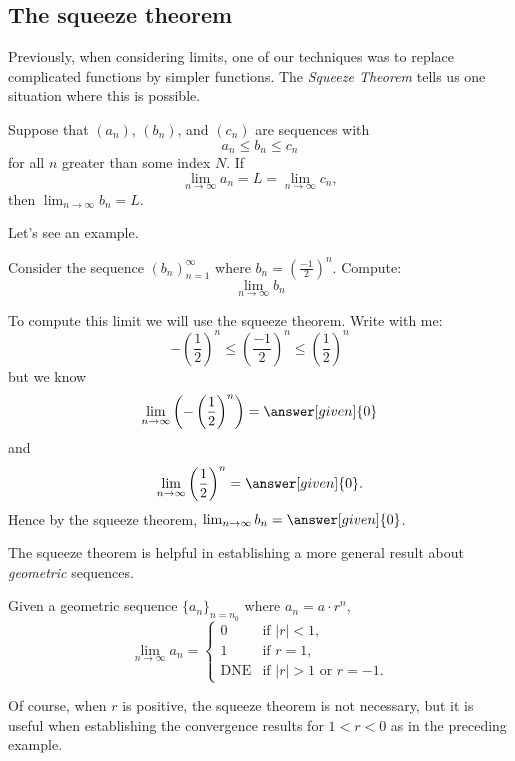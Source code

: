 \documentclass{ximera}
\begin{document}
\subsection{The squeeze theorem}

%

Previously, when considering limits, one of our techniques was to replace 
complicated functions by simpler functions. The \textit{Squeeze Theorem}
tells us one situation where this is possible.

\begin{theorem}
  Suppose that $(a_n)$, $(b_n)$, and $(c_n)$ are sequences with
  \[
  a_n \le b_n \le c_n
  \]
  for all $n$ greater than some index $N$. If
  \[
  \lim_{n\to\infty} a_n = L = \lim_{n\to\infty} c_n,
  \] 
  then $\lim_{n\to\infty} b_n = L$.
\end{theorem}

Let's see an example.

\begin{example}
  Consider the sequence $(b_n)_{n=1}^{\infty}$ where $b_n =
  \left(\frac{-1}{2}\right)^n$. Compute:
  \[
  \lim_{n\to\infty}b_n
  \]
  \begin{explanation}
    To compute this limit we will use the squeeze theorem. Write with
    me:
    \[
    -\left(\frac{1}{2}\right)^n\le \left(\frac{-1}{2}\right)^n \le \left(\frac{1}{2}\right)^n
    \]
    but we know
    \[
    \lim_{n\to \infty}\left(-\left(\frac{1}{2}\right)^n\right) = \answer[given]{0}
    \]
    and
    \[
    \lim_{n\to \infty}\left(\frac{1}{2}\right)^n =\answer[given]{0}.
    \]
    Hence by the squeeze theorem, $\lim_{n\to\infty} b_n = \answer[given]{0}$.
  \end{explanation}
\end{example}

%

The squeeze theorem is helpful in establishing a more general result about \emph{geometric} sequences.
\begin{theorem}
  Given a geometric sequence $\{a_n\}_{n=n_0}$ where $a_n = a \cdot r^{n}$,
  \[
  \lim_{n\to\infty} a_n =
  \begin{cases}
    0 &\text{if $|r|<1$,}\\
    1 &\text{if $r=1$,}\\
    \text{DNE} &\text{if $|r|>1$ or $r=-1$.}
  \end{cases}
  \]
\end{theorem}
Of course, when $r$ is positive, the squeeze theorem is not necessary, but it is useful when establishing the convergence results for $1<r<0$ as in the preceding example.
\end{document}
